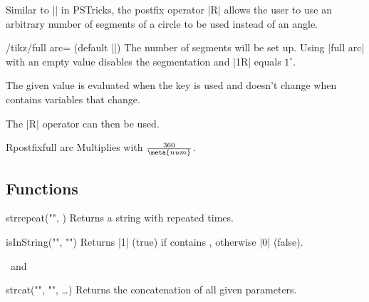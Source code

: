 Similar to |\segments[<num>]| in PSTricks, the postfix operator |R| allows the user
to use an arbitrary number of segments of a circle to be used instead of an angle.

\begin{key}{/tikz/full arc= (default |{}|)}
  The number  of segments will be set up.
  Using |full arc| with an empty value disables the segmentation and |1R| equals $1^\circ$.
  
  The given value  is evaluated when the key is used and doesn't change when
   contains variables that change.
\end{key}
The |R| operator can then be used.
\begin{math-operator}{R}{postfix}{full arc}
  Multiplies  with $\frac{360}{\meta{num}}$.
\end{math-operator}

\subsection{Functions}

\begin{math-function}{strrepeat("", )}
\mathcommand
  Returns a string with  repeated  times.

\begin{codeexample}[]
 \pgfmathresult
\end{codeexample}
\end{math-function}

\begin{math-function}{isInString("", "")}
\mathcommand
  Returns |1| (true) if  contains ,
  otherwise |0| (false).

\begin{codeexample}[]
 \pgfmathresult
\ and\ 
 \pgfmathresult
\end{codeexample}
\end{math-function}

\begin{math-function}{strcat("", "", …)}
\mathcommand
  Returns the concatenation of all given parameters.

\begin{codeexample}[]
 \pgfmathresult
\end{codeexample}
\end{math-function}


